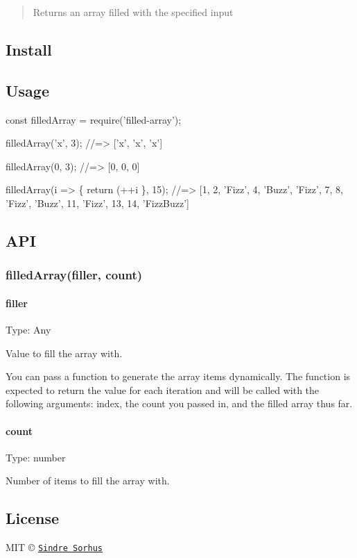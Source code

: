 \begin{quote}
Returns an array filled with the specified input \end{quote}


\subsection*{Install}




\subsection*{Usage}


\begin{DoxyCode}
const filledArray = require('filled-array');

filledArray('x', 3);
//=> ['x', 'x', 'x']

filledArray(0, 3);
//=> [0, 0, 0]

filledArray(i => \{
    return (++i %
\}, 15);
//=> [1, 2, 'Fizz', 4, 'Buzz', 'Fizz', 7, 8, 'Fizz', 'Buzz', 11, 'Fizz', 13, 14, 'FizzBuzz']
\end{DoxyCode}


\subsection*{A\+PI}

\subsubsection*{filled\+Array(filler, count)}

\paragraph*{filler}

Type\+: Any

Value to fill the array with.

You can pass a function to generate the array items dynamically. The function is expected to return the value for each iteration and will be called with the following arguments\+: index, the count you passed in, and the filled array thus far.

\paragraph*{count}

Type\+: {\ttfamily number}

Number of items to fill the array with.

\subsection*{License}

M\+IT © \href{http://sindresorhus.com}{\tt Sindre Sorhus} 